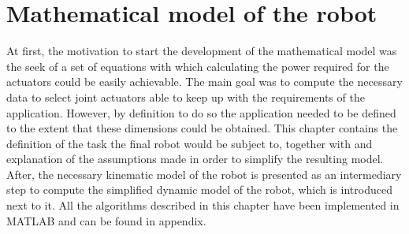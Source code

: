 \chapter{Mathematical model of the robot} %
\label{cha:mathematical_model}

At first, the motivation to start the development of the mathematical model was the seek of a set of equations with which calculating the power required for the actuators could be easily achievable.
The main goal was to compute the necessary data to select joint actuators able to keep up with the requirements of the application.
However, by definition to do so the application needed to be defined to the extent that these dimensions could be obtained.
This chapter contains the definition of the task the final robot would be subject to, together with and explanation of the assumptions made in order to simplify the resulting model. 
After, the necessary kinematic model of the robot is presented as an intermediary step to compute the simplified dynamic model of the robot, which is introduced next to it.
All the algorithms described in this chapter have been implemented in MATLAB and can be found in appendix. %







